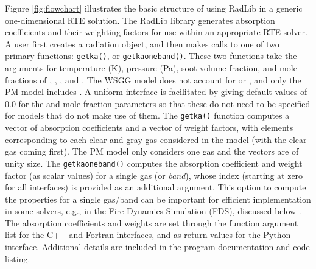 \documentclass[preprint,12pt]{elsarticle}
\begin{document}
    Figure \ref{fig:flowchart} illustrates the basic structure of using RadLib in a generic one-dimensional RTE solution. The RadLib library generates absorption coefficients and their weighting factors for use within an appropriate RTE solver. A user first creates a radiation object, and then makes calls to one of two primary functions: \texttt{get\textunderscore k\textunderscore a()}, or \texttt{get\textunderscore k\textunderscore a\textunderscore oneband()}.
    These two functions take the arguments for temperature (K), pressure (Pa), soot volume fraction, and mole fractions of , , , and . The WSGG model does not account for  or , and only the PM model includes . A uniform interface is facilitated by giving default values of 0.0 for the  and  mole fraction parameters so that these do not need to be specified for models that do not make use of them. The \texttt{get\textunderscore k\textunderscore a()} function computes a vector of absorption coefficients and a vector of weight factors, with elements corresponding to each clear and gray gas considered in the model (with the clear gas coming first). The PM model only considers one gas and the vectors are of unity size. The \texttt{get\textunderscore k\textunderscore a\textunderscore oneband()} computes the absorption coefficient and weight factor (as scalar values) for a single gas (or \emph{band}), whose index (starting at zero for all interfaces) is provided as an additional argument. This option to compute the properties for a single gas/band can be important for efficient implementation in some solvers, e.g., in the Fire Dynamics Simulation (FDS), discussed below \cite{FDS}. The absorption coefficients and weights are set through the function argument list for the C++ and Fortran interfaces, and as return values for the Python interface. Additional details are included in the program documentation and code listing.
%
\end{document}

